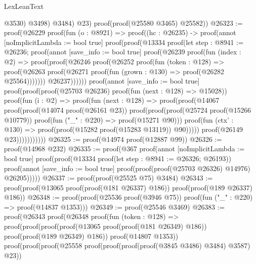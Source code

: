 \begin{lexlean}{LexLeanText}
\begin{coremodule}
              @3530)
            @3498)
          @3484)
        @23)
      proof(proof(@25580 @3465) @25582))
@26323 := proof(@26229
      proof(fun (o : @8921) =>
        proof((hc : @26235) ->
          proof(annot [noImplicitLambda := bool true]
            proof(proof(@13334
                  proof(let step : @8941 := @26236;
                    proof(annot [save_info := bool true]
                      proof(@26239
                          proof(fun (index : @2) =>
                            proof(proof(@26246
                                  proof(@26252
                                      proof(fun (token : @128) =>
                                        proof(@26263
                                            proof(@26271
                                                proof(fun (grown : @130) =>
                                                  proof(@26282 @25564)))))))
                                @26237))))))
                proof(annot [save_info := bool true]
                  proof(proof(proof(@25703 @26236) proof(fun (next : @128) => @15028))
                      proof(fun (i : @2) =>
                        proof(fun (next : @128) =>
                          proof(proof(@14067
                                proof(proof(@14074 proof(@26161 @23))
                                    proof(proof(proof(@25724 proof(@15266 @10779))
                                          proof(fun ("_" : @220) => proof(@15271 @90)))
                                        proof(fun (ctx' : @130) =>
                                          proof(proof(@15282 proof(@15283 @13119)) @90)))))
                              proof(@26149 @23)))))))))))
@26325 := proof(@14974 proof(@12887 @99))
@26326 := proof(@14968 @232)
@26335 := proof(@367
      proof(annot [noImplicitLambda := bool true]
        proof(proof(@13334 proof(let step : @8941 := @26326; @26193))
            proof(annot [save_info := bool true]
              proof(proof(proof(@25703 @26326) @14976) @26205)))))
@26337 := proof(proof(@25525 @75) @3484)
@26343 := proof(proof(@13065 proof(proof(@181 @26337) @186)) proof(proof(@189 @26337) @186))
@26348 := proof(proof(@25536 proof(@3946 @75)) proof(fun ("_" : @220) => proof(@14837 @1353)))
@26349 := proof(@25546 @3469)
@26383 := proof(@26343
      proof(@26348
          proof(fun (token : @128) =>
            proof(proof(proof(proof(@13065 proof(proof(@181 @26349) @186))
                    proof(proof(@189 @26349) @186))
                  proof(@14807 @1353))
                proof(proof(proof(@25558 proof(proof(proof(proof(@3845 @3486) @3484) @3587) @23))

\end{coremodule}
\end{lexlean}

